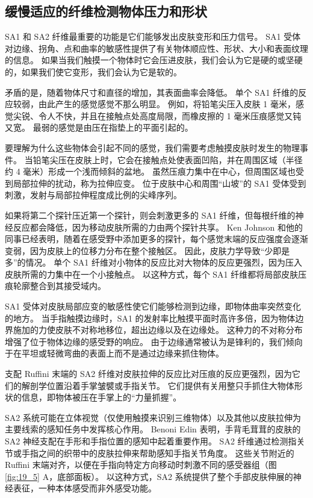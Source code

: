 \subsection{缓慢适应的纤维检测物体压力和形状}

SA1 和 SA2 纤维最重要的功能是它们能够发出皮肤变形和压力信号。 SA1 受体对边缘、拐角、点和曲率的敏感性提供了有关物体顺应性、形状、大小和表面纹理的信息。 如果当我们触摸一个物体时它会压进皮肤，我们会认为它是硬的或坚硬的，如果我们使它变形，我们会认为它是软的。

矛盾的是，随着物体尺寸和直径的增加，其表面曲率会降低。 单个 SA1 纤维的反应较弱，由此产生的感觉感觉不那么明显。 例如，将铅笔尖压入皮肤 1 毫米，感觉尖锐、令人不快，并且在接触点处高度局限，而橡皮擦的 1 毫米压痕感觉又钝又宽。 最弱的感觉是由压在指垫上的平面引起的。

要理解为什么这些物体会引起不同的感觉，我们需要考虑触摸皮肤时发生的物理事件。 当铅笔尖压在皮肤上时，它会在接触点处使表面凹陷，并在周围区域（半径约 4 毫米）形成一个浅而倾斜的盆地。 虽然压痕力集中在中心，但周围区域也受到局部拉伸的扰动，称为拉伸应变。 位于皮肤中心和周围“山坡”的 SA1 受体受到刺激，发射与局部拉伸程度成比例的尖峰序列。

如果将第二个探针压近第一个探针，则会刺激更多的 SA1 纤维，但每根纤维的神经反应都会降低，因为移动皮肤所需的力由两个探针共享。 Ken Johnson 和他的同事已经表明，随着在感受野中添加更多的探针，每个感觉末端的反应强度会逐渐变弱，因为皮肤上的位移力分布在整个接触区。 因此，皮肤力学导致“少即是多”的情况。 单个 SA1 纤维对小物体的反应比对大物体的反应更强烈，因为压入皮肤所需的力集中在一个小接触点。 以这种方式，每个 SA1 纤维都将局部皮肤压痕轮廓整合到其接受域内。

SA1 受体对皮肤局部应变的敏感性使它们能够检测到边缘，即物体曲率突然变化的地方。 当手指触摸边缘时，SA1 的发射率比触摸平面时高许多倍，因为物体边界施加的力使皮肤不对称地移位，超出边缘以及在边缘处。 这种力的不对称分布增强了位于物体边缘的感受野的响应。 由于边缘通常被认为是锋利的，我们倾向于在平坦或轻微弯曲的表面上而不是通过边缘来抓住物体。

支配 Ruffini 末端的 SA2 纤维对皮肤拉伸的反应比对压痕的反应更强烈，因为它们的解剖学位置沿着手掌皱襞或手指关节。 它们提供有关用整只手抓住大物体形状的信息，即物体被压在手掌上的“力量抓握”。

SA2 系统可能在立体视觉（仅使用触摸来识别三维物体）以及其他以皮肤拉伸为主要线索的感知任务中发挥核心作用。 Benoni Edin 表明，手背毛茸茸的皮肤的 SA2 神经支配在手形和手指位置的感知中起着重要作用。 SA2 纤维通过检测指关节或手指之间的织带中的皮肤拉伸来帮助感知手指关节角度。 这些关节附近的 Ruffini 末端对齐，以便在手指向特定方向移动时刺激不同的感受器组（图 \ref{fig:19_5} A，底部面板）。 以这种方式，SA2 系统提供了整个手部皮肤伸展的神经表征，一种本体感受而非外感受功能。


